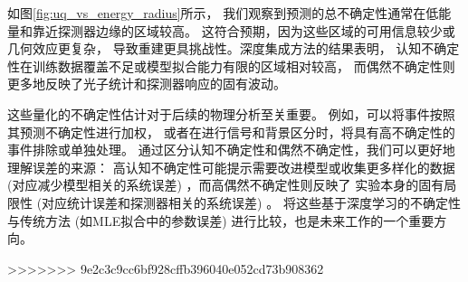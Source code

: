 
如图\ref{fig:uq_vs_energy_radius}所示，
我们观察到预测的总不确定性通常在低能量和靠近探测器边缘的区域较高。
这符合预期，因为这些区域的可用信息较少或几何效应更复杂，
导致重建更具挑战性。深度集成方法的结果表明，
认知不确定性在训练数据覆盖不足或模型拟合能力有限的区域相对较高，
而偶然不确定性则更多地反映了光子统计和探测器响应的固有波动。


这些量化的不确定性估计对于后续的物理分析至关重要。
例如，可以将事件按照其预测不确定性进行加权，
或者在进行信号和背景区分时，将具有高不确定性的事件排除或单独处理。
通过区分认知不确定性和偶然不确定性，我们可以更好地理解误差的来源：
高认知不确定性可能提示需要改进模型或收集更多样化的数据 
(对应减少模型相关的系统误差) ，而高偶然不确定性则反映了
实验本身的固有局限性 (对应统计误差和探测器相关的系统误差) 。
将这些基于深度学习的不确定性与传统方法 
(如MLE拟合中的参数误差) 进行比较，也是未来工作的一个重要方向。

>>>>>>> 9e2c3c9cc6bf928cffb396040e052cd73b908362
